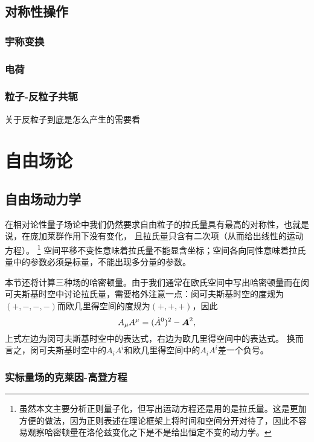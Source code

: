 \documentclass[hyperref, UTF8, a4paper]{ctexart}
\begin{document}

\subsection{对称性操作}

\subsubsection{宇称变换}


\subsubsection{电荷}

\subsubsection{粒子-反粒子共轭}

关于反粒子到底是怎么产生的需要看%

\section{自由场论}

\subsection{自由场动力学}\label{sec:qft-free-dynamics}

在相对论性量子场论中我们仍然要求自由粒子的拉氏量具有最高的对称性，也就是说，在庞加莱群作用下没有变化，
且拉氏量只含有二次项（从而给出线性的运动方程）。%
\footnote{虽然本文主要分析正则量子化，但写出运动方程还是用的是拉氏量。这是更加方便的做法，因为正则表述在理论框架上将时间和空间分开对待了，因此不容易观察哈密顿量在洛伦兹变化之下是不是给出恒定不变的动力学。}
空间平移不变性意味着拉氏量不能显含坐标；空间各向同性意味着拉氏量中的参数必须是标量，不能出现多分量的参数。

本节还将计算三种场的哈密顿量。由于我们通常在欧氏空间中写出哈密顿量而在闵可夫斯基时空中讨论拉氏量，需要格外注意一点：闵可夫斯基时空的度规为$(+, -, -, -)$而欧几里得空间的度规为$(+, +, +)$，因此
\[
    A_\mu A^\mu = (\dot{A}^0)^2 - \vb*{A}^2,
\]
上式左边为闵可夫斯基时空中的表达式，右边为欧几里得空间中的表达式。
换而言之，闵可夫斯基时空中的$A_i A^i$和欧几里得空间中的$A_i A^i$差一个负号。

\subsubsection{实标量场的克莱因-高登方程}\label{sec:k-g-eq}
\end{document}
